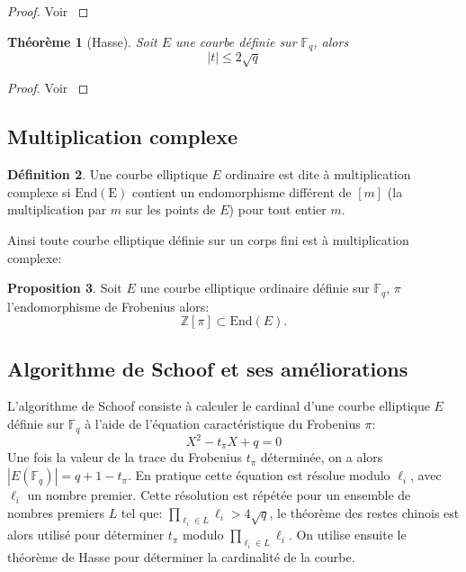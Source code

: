 \documentclass[10pt,a4paper]{book}
\theoremstyle{plain}
\newtheorem{thm}{Théorème}
\theoremstyle{definition}
\theoremstyle{definition}
\theoremstyle{definition}
\newtheorem{prop}[thm]{Proposition}
\theoremstyle{definition}
\newtheorem{defi}[thm]{Définition}
\theoremstyle{remark}
\theoremstyle{remark}
\begin{document}
\begin{proof}
Voir \cite[Theorem V.1.1]{Silv1}
\end{proof}

\begin{thm}[Hasse]
Soit $E$ une courbe définie sur $\mathbb{F}_q$, alors 
\begin{equation}
|t| \leqslant 2 \sqrt{q}
\end{equation}
\end{thm}

\begin{proof}
Voir \cite[Theorem V.1.1]{Silv1}
\end{proof}





\subsection{Multiplication complexe}

\begin{defi}
Une courbe elliptique $E$ ordinaire est dite à multiplication complexe si $\mathrm{End(E)}$ contient un endomorphisme différent de $[m]$ (la multiplication par $m$ sur les points de $E$) pour tout entier $m$. 
\end{defi} 

Ainsi toute courbe elliptique définie sur un corps fini est à multiplication complexe:

\begin{prop}
Soit $E$ une courbe elliptique ordinaire définie sur $\mathbb{F}_q$, $\pi$ l'endomorphisme de Frobenius alors: 
\[
\mathbb{Z}[\pi] \subset \mathrm{End}(E).
\]
\end{prop}


\subsection{Algorithme de Schoof et ses améliorations}

L'algorithme de Schoof \cite{Schoof85} consiste à calculer le cardinal d'une courbe elliptique $E$ définie sur $\mathbb{F}_q$ à l'aide de l'équation caractéristique du Frobenius $\pi$:
\begin{equation*}
X^2-t_{\pi}X+q=0
\end{equation*}
Une fois la valeur de la trace du Frobenius $t_{\pi}$ déterminée, on a alors $|E(\mathbb{F}_q)|=q+1-t_{\pi}$. En pratique cette équation est résolue modulo $\ell_i$, avec $\ell_i$ un nombre premier. Cette résolution est répétée pour un ensemble de nombres premiers $L$ tel que: $\prod_{\ell_i \in L}\ell_i>4 \sqrt{q}$, le théorème des restes chinois est alors utilisé pour déterminer $t_{\pi}$ modulo $\prod_{\ell_i \in L}\ell_i$. On utilise ensuite le théorème de Hasse pour déterminer la cardinalité de la courbe.
\end{document}
